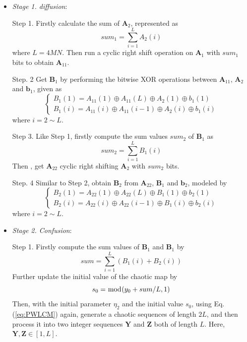 \documentclass[final,3p,times]{elsarticle}
\begin{document}
\begin{itemize}
	
	\item \emph{Stage 1. diffusion}:
	
	Step 1. Firstly calculate the sum of $\bm{A}_2$, represented as
	\begin{equation}
	sum_1 = \sum\limits_{i= 1}^{L} A_2(i)
	\label{eq:sum1}
	\end{equation}
	where $L=4MN$. Then run a cyclic right shift operation on $\bm{A}_1$ with $sum_1$ bits to obtain $\bm{A}_{11}$.
	
	Step. 2 Get $\bm{B}_{1}$ by performing the bitwise XOR operations between $\bm{A}_{11}$, $\bm{A}_{2}$ and $\bm{b}_{1}$, given as
	\begin{equation}
	\left\{ \begin{array}{l}
	B_1(1) = A_{11}(1) \oplus A_{11}(L) \oplus A_{2}(1) \oplus b_{1}(1)\\
	B_1(i) = A_{11}(i) \oplus A_{11}(i-1) \oplus A_{2}(i) \oplus b_{1}(i)
	\end{array} \right.
	\label{eq:B1_diffusion}
	\end{equation}
	where $i=2 \sim L$.
	
	Step 3. Like Step 1, firstly compute the sum values $sum_2$ of $\bm{B}_1$ as
	\begin{equation}
	sum_2 = \sum\limits_{i= 1}^{L} B_1(i)
	\label{eq:sum2}
	\end{equation}
	Then , get $\bm{A}_{22}$ cyclic right shifting $\bm{A}_2$ with $sum_2$ bits.
	
	Step. 4 Similar to Step 2, obtain $\bm{B}_{2}$ from $\bm{A}_{22}$, $\bm{B}_{1}$ and $\bm{b}_{2}$, modeled by
	\begin{equation}
	\left\{ \begin{array}{l}
	B_2(1) = A_{22}(1) \oplus A_{22}(L) \oplus B_{1}(1) \oplus b_{2}(1)\\
	B_2(i) = A_{22}(i) \oplus A_{22}(i-1) \oplus B_{1}(i) \oplus b_{2}(i)
	\end{array} \right.
	\label{eq:B2_diffusion}
	\end{equation}
	where $i=2 \sim L$.
	
	\item \emph{Stage 2. Confusion}:
	
	Step 1. Firstly compute the sum values of $\bm{B}_1$ and $\bm{B}_1$ by
	\begin{equation}
	sum = \sum\limits_{i= 1}^{L} (B_1(i)+B_2(i))
	\label{eq:sum3}
	\end{equation}
	Further update the initial value of the chaotic map by
	\begin{equation}
	s_0 = \bmod(y_0+sum/L,1)\\
	\label{eq:update_y0}
	\end{equation}
	Then, with the initial parameter $\eta_2$ and the initial value $s_0$,  using Eq. (\ref{eq:PWLCM}) again, generate a chaotic sequences of length $2L$, and then process it into two integer sequences $\bm{Y}$ and $\bm{Z}$ both of length $L$. Here, $\bm{Y},\bm{Z} \in [1,L]$.
	

\end{itemize}
\end{document}
